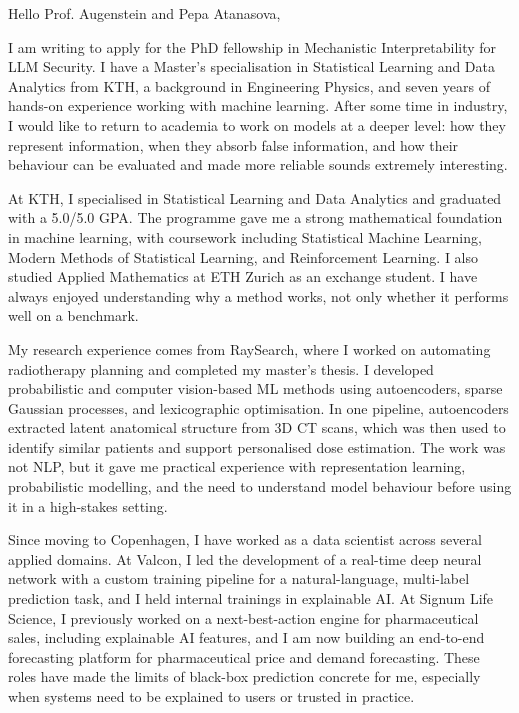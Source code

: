 \documentclass[11pt,a4paper]{moderncv}
\begin{document}
\makecvtitle
Hello Prof. Augenstein and Pepa Atanasova,

\vspace*{2em}
I am writing to apply for the PhD fellowship in Mechanistic Interpretability for LLM Security. I have a Master's specialisation in Statistical Learning and Data Analytics from KTH, a background in Engineering Physics, and seven years of hands-on experience working with machine learning. After some time in industry, I would like to return to academia to work on models at a deeper level: how they represent information, when they absorb false information, and how their behaviour can be evaluated and made more reliable sounds extremely interesting.

\hspace*{2em}
At KTH, I specialised in Statistical Learning and Data Analytics and graduated with a 5.0/5.0 GPA. The programme gave me a strong mathematical foundation in machine learning, with coursework including Statistical Machine Learning, Modern Methods of Statistical Learning, and Reinforcement Learning. I also studied Applied Mathematics at ETH Zurich as an exchange student. I have always enjoyed understanding why a method works, not only whether it performs well on a benchmark.

\hspace*{2em}
My research experience comes from RaySearch, where I worked on automating radiotherapy planning and completed my master's thesis. I developed probabilistic and computer vision-based ML methods using autoencoders, sparse Gaussian processes, and lexicographic optimisation. In one pipeline, autoencoders extracted latent anatomical structure from 3D CT scans, which was then used to identify similar patients and support personalised dose estimation. The work was not NLP, but it gave me practical experience with representation learning, probabilistic modelling, and the need to understand model behaviour before using it in a high-stakes setting.

\hspace*{2em}
Since moving to Copenhagen, I have worked as a data scientist across several applied domains. At Valcon, I led the development of a real-time deep neural network with a custom training pipeline for a natural-language, multi-label prediction task, and I held internal trainings in explainable AI. At Signum Life Science, I previously worked on a next-best-action engine for pharmaceutical sales, including explainable AI features, and I am now building an end-to-end forecasting platform for pharmaceutical price and demand forecasting. These roles have made the limits of black-box prediction concrete for me, especially when systems need to be explained to users or trusted in practice.
\end{document}

